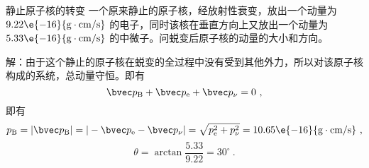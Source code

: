 \begin{example}{静止原子核的转变}
一个原来静止的原子核，经放射性衰变，放出一个动量为 $9.22\e{-16}{\rm g\cdot cm/s}$ 的电子，同时该核在垂直方向上又放出一个动量为 $5.33\e{-16}{\rm g\cdot cm/s}$ 的中微子。问蜕变后原子核的动量的大小和方向。

解：由于这个静止的原子核在蜕变的全过程中没有受到其他外力，所以对该原子核构成的系统，总动量守恒。即有
\begin{equation}
\bvec p_{\rm B}+\bvec p_{\rm e}+\bvec p_{\rm \nu}=0~,
\end{equation}
即有
\begin{equation}
p_{\rm B}=|\bvec p_{\rm B}|=|-\bvec p_{\rm e}-\bvec p_{\rm \nu}|=\sqrt{p_{\rm e}^{2}+p_{\rm \nu}^{2}}=10.65\e{-16}{\rm g\cdot cm/s}~,
\end{equation}
\begin{equation}
\theta=\arctan\frac{5.33}{9.22}=30^\circ~.
\end{equation}
\end{example}
